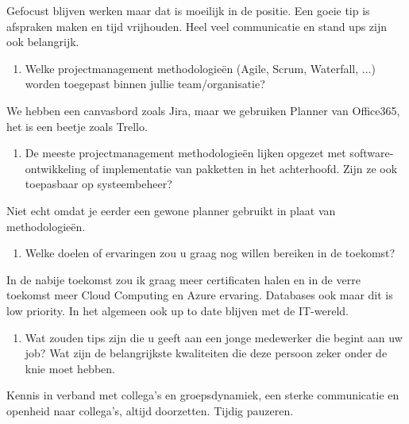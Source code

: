 \documentclass{hogent-article}
\begin{document}
    Gefocust blijven werken maar dat is moeilijk in de positie. Een goeie tip is afspraken maken en tijd vrijhouden. Heel veel communicatie en stand ups zijn ook belangrijk.\\
    
    \begin{enumerate}[resume]\bfseries
        \item Welke projectmanagement methodologieën (Agile, Scrum, Waterfall, ...) worden toegepast binnen jullie team/organisatie? 
    \end{enumerate}
    
    We hebben een canvasbord zoals Jira, maar we gebruiken Planner van Office365, het is een beetje zoals Trello.\\
    
    \begin{enumerate}[resume]\bfseries
        \item De meeste projectmanagement methodologieën lijken opgezet met software-ontwikkeling of implementatie van pakketten in het achterhoofd. Zijn ze ook toepasbaar op systeembeheer? 
    \end{enumerate}
    
    Niet echt omdat je eerder een gewone planner gebruikt in plaat van methodologieën.\\
    
    \begin{enumerate}[resume]\bfseries
        \item Welke doelen of ervaringen zou u graag nog willen bereiken in de toekomst?
    \end{enumerate}
    
    In de nabije toekomst zou ik graag meer certificaten halen en in de verre toekomst meer Cloud Computing en Azure ervaring. Databases ook maar dit is low priority. In het algemeen ook up to date blijven met de IT-wereld.\\
    
    \begin{enumerate}[resume]\bfseries
        \item Wat zouden tips zijn die u geeft aan een jonge medewerker die begint aan uw job? Wat zijn de belangrijkste kwaliteiten die deze persoon zeker onder de knie moet hebben.
    \end{enumerate}
    
    Kennis in verband met collega's en groepsdynamiek, een sterke communicatie en openheid naar collega's, altijd doorzetten. Tijdig pauzeren.
    
\end{document}
